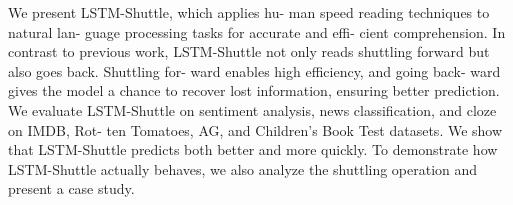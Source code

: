 We present LSTM-Shuttle, which applies hu- man speed reading techniques to natural lan- guage processing tasks for accurate and effi- cient comprehension. In contrast to previous work, LSTM-Shuttle not only reads shuttling forward but also goes back. Shuttling for- ward enables high efficiency, and going back- ward gives the model a chance to recover lost information, ensuring better prediction. We evaluate LSTM-Shuttle on sentiment analysis, news classification, and cloze on IMDB, Rot- ten Tomatoes, AG, and Children's Book Test datasets. We show that LSTM-Shuttle predicts both better and more quickly. To demonstrate how LSTM-Shuttle actually behaves, we also analyze the shuttling operation and present a case study.
